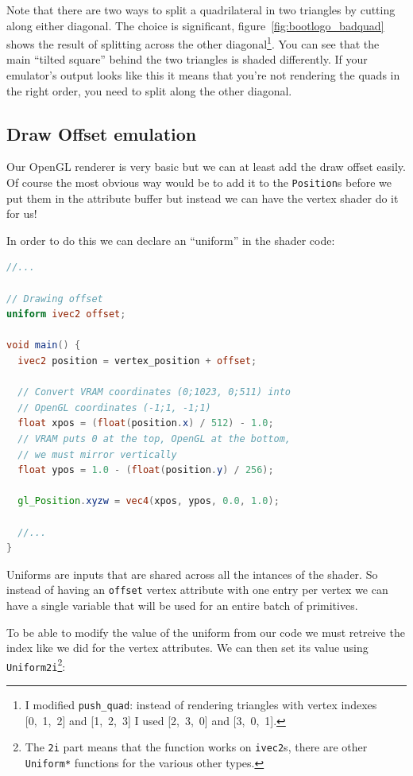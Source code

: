 \documentclass[a4paper]{article}
\newcommand{\code}[1] {\texttt{#1}}
\begin{document}
Note that there are two ways to split a quadrilateral in two triangles
by cutting along either diagonal. The choice is significant,
figure~\ref{fig:bootlogo_badquad} shows the result of splitting across
the other diagonal\footnote{I modified \code{push\_quad}: instead of
  rendering triangles with vertex indexes [0,~1,~2] and [1,~2,~3] I
  used [2,~3,~0] and [3,~0,~1].}. You can see that the main ``tilted
square'' behind the two triangles is shaded differently. If your
emulator's output looks like this it means that you're not rendering
the quads in the right order, you need to split along the other
diagonal.

\subsection{Draw Offset emulation}

Our OpenGL renderer is very basic but we can at least add the draw
offset easily. Of course the most obvious way would be to add it to
the \code{Position}s before we put them in the attribute buffer but
instead we can have the vertex shader do it for us!

In order to do this we can declare an ``uniform'' in the shader code:

\begin{lstlisting}[language=glsl]
//...

// Drawing offset
uniform ivec2 offset;

void main() {
  ivec2 position = vertex_position + offset;

  // Convert VRAM coordinates (0;1023, 0;511) into
  // OpenGL coordinates (-1;1, -1;1)
  float xpos = (float(position.x) / 512) - 1.0;
  // VRAM puts 0 at the top, OpenGL at the bottom,
  // we must mirror vertically
  float ypos = 1.0 - (float(position.y) / 256);

  gl_Position.xyzw = vec4(xpos, ypos, 0.0, 1.0);

  //...
}
\end{lstlisting}

Uniforms are inputs that are shared across all the intances of the
shader. So instead of having an \code{offset} vertex attribute with
one entry per vertex we can have a single variable that will be used
for an entire batch of primitives.

To be able to modify the value of the uniform from our code we must
retreive the index like we did for the vertex attributes. We can then
set its value using \code{Uniform2i}\footnote{The \code{2i} part means
  that the function works on \code{ivec2}s, there are other
  \code{Uniform*} functions for the various other types.}:
\end{document}

